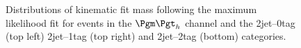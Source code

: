 \begin{figure}
\begin{center}

\end{center}
\caption{
Distributions of kinematic fit mass following the maximum likelihood fit for
events in the $\mutau$ channel and the 2jet--0tag (top left) 2jet--1tag (top
right) and 2jet--2tag (bottom) categories.}
\label{fig:PostFitMHmutau}
\end{figure} 


